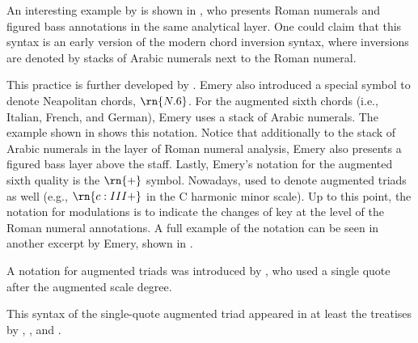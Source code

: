 
An interesting example by \textcite{bussler1878praktische}
is shown in
, who
presents Roman numerals and figured bass annotations in the
same analytical layer. One could claim that this syntax is
an early version of the modern chord inversion syntax, where
inversions are denoted by stacks of Arabic numerals next to
the Roman numeral.


This practice is further developed by
\textcite{emery1879elements}. Emery also introduced a
special symbol to denote Neapolitan chords, $\rn{N.6}$. For
the augmented sixth chords (i.e., Italian, French, and
German), Emery uses a stack of Arabic numerals. The example
shown in  shows
this notation. Notice that additionally to the stack of
Arabic numerals in the layer of Roman numeral analysis,
Emery also presents a figured bass layer above the staff.
Lastly, Emery's notation for the augmented sixth quality is
the $\rn{+}$ symbol. Nowadays, used to denote augmented
triads as well (e.g., $\rn{c:III+}$ in the C harmonic minor
scale). Up to this point, the notation for modulations is to
indicate the changes of key at the level of the Roman
numeral annotations. A full example of the notation can be
seen in another excerpt by Emery, shown in
.


A notation for augmented triads was introduced by
\textcite{jadassohn1883lehrbuch}, who used a single quote
after the augmented scale degree.


This syntax of the single-quote augmented triad appeared in
at least the treatises by \textcite{broekhoven1889system},
\textcite{buwa1893schule}, and
\textcite{shepard1896harmony}.


